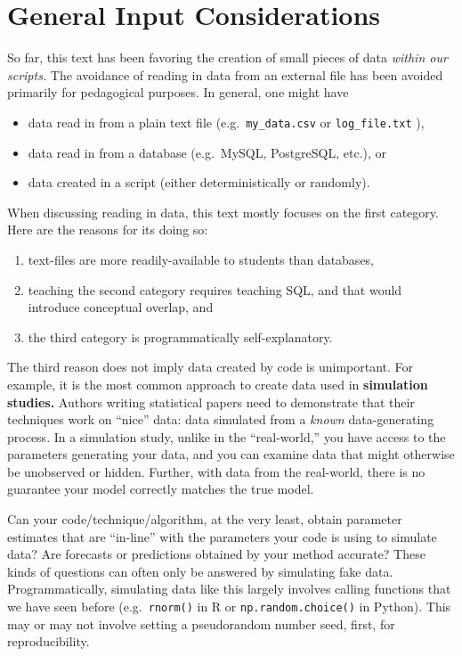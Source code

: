 \documentclass[
  12pt,
  krantz2]{krantz}
\providecommand{\tightlist}{%
  \setlength{\itemsep}{0pt}\setlength{\parskip}{0pt}}
\begin{document}
\hypertarget{general-input-considerations}{%
\section{General Input Considerations}\label{general-input-considerations}}

So far, this text has been favoring the creation of small pieces of data \emph{within our scripts.} The avoidance of reading in data from an external file has been avoided primarily for pedagogical purposes. In general, one might have

\begin{itemize}
\tightlist
\item
  data read in from a plain text file (e.g.~\texttt{my\_data.csv} or \texttt{log\_file.txt} ),
\item
  data read in from a database (e.g.~MySQL, PostgreSQL, etc.), or
\item
  data created in a script (either deterministically or randomly).
\end{itemize}

When discussing reading in data, this text mostly focuses on the first category. Here are the reasons for its doing so:

\begin{enumerate}
\def\labelenumi{\arabic{enumi}.}
\tightlist
\item
  text-files are more readily-available to students than databases,
\item
  teaching the second category requires teaching SQL, and that would introduce conceptual overlap, and
\item
  the third category is programmatically self-explanatory.
\end{enumerate}

The third reason does not imply data created by code is unimportant. For example, it is the most common approach to create data used in \textbf{simulation studies.} Authors writing statistical papers need to demonstrate that their techniques work on ``nice'' data: data simulated from a \emph{known} data-generating process. In a simulation study, unlike in the ``real-world,'' you have access to the parameters generating your data, and you can examine data that might otherwise be unobserved or hidden. Further, with data from the real-world, there is no guarantee your model correctly matches the true model.

Can your code/technique/algorithm, at the very least, obtain parameter estimates that are ``in-line'' with the parameters your code is using to simulate data? Are forecasts or predictions obtained by your method accurate? These kinds of questions can often only be answered by simulating fake data. Programmatically, simulating data like this largely involves calling functions that we have seen before (e.g.~\texttt{rnorm()} in R or \texttt{np.random.choice()} in Python). This may or may not involve setting a pseudorandom number seed, first, for reproducibility.
\end{document}
